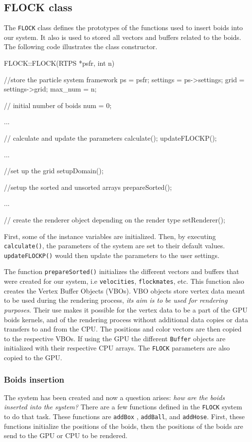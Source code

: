 \subsection{FLOCK class}
The \texttt{FLOCK} class defines the prototypes of the functions used to insert boids into our system. It also is used to stored all vectors and buffers related to the boids. The following code illustrates the class constructor. 

\begin{cppcode}{0}
FLOCK::FLOCK(RTPS *psfr, int n)
 {
 	//store the particle system framework
 	ps = psfr;
	settings = ps->settings;
	grid = settings->grid;
	max_num = n;
	
	// initial number of boids
	num = 0;
 	
	...
 
 	// calculate and update the parameters
	calculate();
	updateFLOCKP();

	...

	//set up the grid
	setupDomain();
	
	//setup the sorted and unsorted arrays
	prepareSorted();
 	 
	 ...
		
	// create the renderer object depending on the render type		
	setRenderer(); 
}
\end{cppcode}

First, some of the instance variables are initialized. Then, by executing \texttt{calculate()}, the parameters of the system are set to their default values. \texttt{updateFLOCKP()} would then update the parameters to the user settings.

The function \texttt{prepareSorted()} initializes the different vectors and buffers that were created for our system, i.e \texttt{velocities}, \texttt{flockmates}, etc. This function also creates the Vertex Buffer Objects (VBOs). VBO objects store vertex data meant to be used during the rendering process, {\em its aim is to be used for rendering purposes}\cite{vbo}. Their use makes it possible for the vertex data to be a part of the GPU boids kernels, and of the rendering process without additional data copies or data transfers to and from the CPU. The positions and color vectors are then copied to the respective VBOs. If using the GPU the different \texttt{Buffer} objects are initialized with their respective CPU arrays. The \texttt{FLOCK} parameters are also copied to the GPU. 

\subsubsection{Boids insertion}
The system has been created and now a question arises: \textit{how are the boids inserted into the system?} There are a few functions defined in the \texttt{FLOCK} system to do that task. These functions are \texttt{addBox} , \texttt{addBall}, and \texttt{addHose}. First, these functions initialize the positions of the boids, then the positions of the boids are send to the GPU or CPU to be rendered. 

